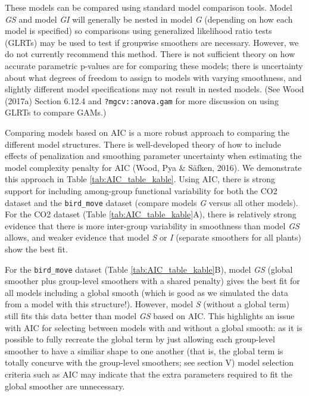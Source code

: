 \documentclass[12pt]{article}
\begin{document}
These models can be compared using standard model comparison tools.
Model \emph{GS} and model \emph{GI} will generally be nested in model
\emph{G} (depending on how each model is specified) so comparisons using
generalized likelihood ratio tests (GLRTs) may be used to test if
groupwise smoothers are necessary. However, we do not currently
recommend this method. There is not sufficient theory on how accurate
parametric p-values are for comparing these models; there is uncertainty
about what degrees of freedom to assign to models with varying
smoothness, and slightly different model specifications may not result
in nested models. (See Wood (2017a) Section 6.12.4 and
\texttt{?mgcv::anova.gam} for more discussion on using GLRTs to compare
GAMs.)

Comparing models based on AIC is a more robust approach to comparing the
different model structures. There is well-developed theory of how to
include effects of penalization and smoothing parameter uncertainty when
estimating the model complexity penalty for AIC (Wood, Pya \& Säfken,
2016). We demonstrate this approach in Table \ref{tab:AIC_table_kable}.
Using AIC, there is strong support for including among-group functional
variability for both the CO2 dataset and the \texttt{bird\_move} dataset
(compare models \emph{G} versus all other models). For the CO2 dataset
(Table \ref{tab:AIC_table_kable}A), there is relatively strong evidence
that there is more inter-group variability in smoothness than model
\emph{GS} allows, and weaker evidence that model \emph{S} or \emph{I}
(separate smoothers for all plants) show the best fit.

For the \texttt{bird\_move} dataset (Table \ref{tab:AIC_table_kable}B),
model \emph{GS} (global smoother plus group-level smoothers with a
shared penalty) gives the best fit for all models including a global
smooth (which is good as we simulated the data from a model with this
structure!). However, model \emph{S} (without a global term) still fits
this data better than model \emph{GS} based on AIC. This highlights an
issue with AIC for selecting between models with and without a global
smooth: as it is possible to fully recreate the global term by just
allowing each group-level smoother to have a similiar shape to one
another (that is, the global term is totally concurve with the
group-level smoothers; see section V) model selection criteria such as
AIC may indicate that the extra parameters required to fit the global
smoother are unnecessary.
\end{document}
